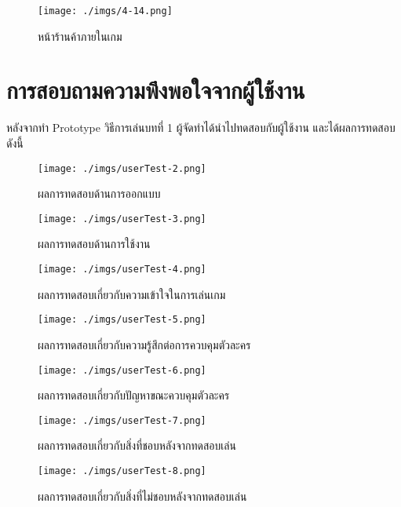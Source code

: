 \documentclass[12pt,oneside,openright,a4paper]{cpe-thai-project}
\begin{document}
\begin{enumerate}
\begin{itemize}
      \begin{figure}[H]\centering
        \texttt{[image: ./imgs/4-14.png]}
        \caption{หน้าร้านค้าภายในเกม}\label{fig:4-14}
      \end{figure}

    \end{itemize}

\end{enumerate}

\section{การสอบถามความพึงพอใจจากผู้ใช้งาน}
หลังจากทำ Prototype วิธีการเล่นบทที่ 1 ผู้จัดทำได้นำไปทดสอบกับผู้ใช้งาน และได้ผลการทดสอบ ดังนี้

\begin{figure}[H]\centering
  \texttt{[image: ./imgs/userTest-2.png]}
  \caption{ผลการทดสอบด้านการออกแบบ}\label{fig:userTest-2}
\end{figure}

\begin{figure}[H]\centering
  \texttt{[image: ./imgs/userTest-3.png]}
  \caption{ผลการทดสอบด้านการใช้งาน}\label{fig:userTest-3}
\end{figure}

\begin{figure}[H]\centering
  \texttt{[image: ./imgs/userTest-4.png]}
  \caption{ผลการทดสอบเกี่ยวกับความเข้าใจในการเล่นเกม}\label{fig:userTest-4}
\end{figure}

\begin{figure}[H]\centering
  \texttt{[image: ./imgs/userTest-5.png]}
  \caption{ผลการทดสอบเกี่ยวกับความรู้สึกต่อการควบคุมตัวละคร}\label{fig:userTest-5}
\end{figure}

\begin{figure}[H]\centering
  \texttt{[image: ./imgs/userTest-6.png]}
  \caption{ผลการทดสอบเกี่ยวกับปัญหาขณะควบคุมตัวละคร}\label{fig:userTest-6}
\end{figure}

\begin{figure}[H]\centering
  \texttt{[image: ./imgs/userTest-7.png]}
  \caption{ผลการทดสอบเกี่ยวกับสิ่งที่ชอบหลังจากทดสอบเล่น}\label{fig:userTest-7}
\end{figure}

\begin{figure}[H]\centering
  \texttt{[image: ./imgs/userTest-8.png]}
  \caption{ผลการทดสอบเกี่ยวกับสิ่งที่ไม่ชอบหลังจากทดสอบเล่น}\label{fig:userTest-8}
\end{figure}
\end{document}
